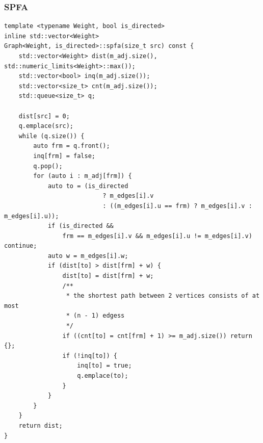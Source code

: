 \documentclass[UTF8]{article}
\begin{document}
\subsubsection{SPFA}
\begin{verbatim}
template <typename Weight, bool is_directed>
inline std::vector<Weight>
Graph<Weight, is_directed>::spfa(size_t src) const {
	std::vector<Weight> dist(m_adj.size(), std::numeric_limits<Weight>::max());
	std::vector<bool> inq(m_adj.size());
	std::vector<size_t> cnt(m_adj.size());
	std::queue<size_t> q;

	dist[src] = 0;
	q.emplace(src);
	while (q.size()) {
		auto frm = q.front();
		inq[frm] = false;
		q.pop();
		for (auto i : m_adj[frm]) {
			auto to = (is_directed
						   ? m_edges[i].v
						   : ((m_edges[i].u == frm) ? m_edges[i].v : m_edges[i].u));
			if (is_directed &&
				frm == m_edges[i].v && m_edges[i].u != m_edges[i].v) continue;
			auto w = m_edges[i].w;
			if (dist[to] > dist[frm] + w) {
				dist[to] = dist[frm] + w;
				/**
				 * the shortest path between 2 vertices consists of at most
				 * (n - 1) edgess
				 */
				if ((cnt[to] = cnt[frm] + 1) >= m_adj.size()) return {};
				if (!inq[to]) {
					inq[to] = true;
					q.emplace(to);
				}
			}
		}
	}
	return dist;
}
\end{verbatim}
\end{document}
